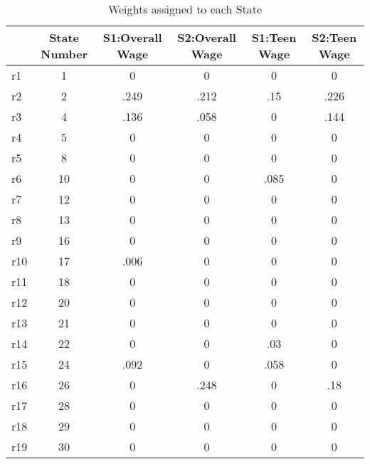 \begin{table}[htbp]\centering
\caption{Weights assigned to each State}
\begin{tabular}{l*{5}{c}}
\toprule
            &State Number&S1:Overall Wage&S2:Overall Wage&S1:Teen Wage&S2:Teen Wage\\
\midrule
r1          &           1&           0&           0&           0&           0\\
r2          &           2&        .249&        .212&         .15&        .226\\
r3          &           4&        .136&        .058&           0&        .144\\
r4          &           5&           0&           0&           0&           0\\
r5          &           8&           0&           0&           0&           0\\
r6          &          10&           0&           0&        .085&           0\\
r7          &          12&           0&           0&           0&           0\\
r8          &          13&           0&           0&           0&           0\\
r9          &          16&           0&           0&           0&           0\\
r10         &          17&        .006&           0&           0&           0\\
r11         &          18&           0&           0&           0&           0\\
r12         &          20&           0&           0&           0&           0\\
r13         &          21&           0&           0&           0&           0\\
r14         &          22&           0&           0&         .03&           0\\
r15         &          24&        .092&           0&        .058&           0\\
r16         &          26&           0&        .248&           0&         .18\\
r17         &          28&           0&           0&           0&           0\\
r18         &          29&           0&           0&           0&           0\\
r19         &          30&           0&           0&           0&           0\\

\end{tabular}
\end{table}
